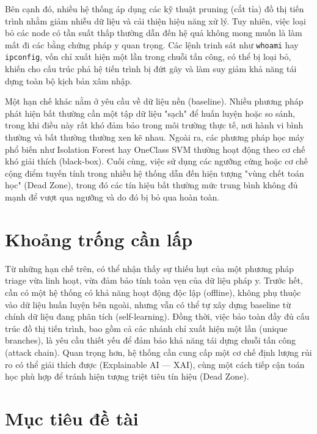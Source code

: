 \documentclass[../main.tex]{subfiles}
\begin{document}
Bên cạnh đó, nhiều hệ thống áp dụng các kỹ thuật pruning (cắt tỉa) đồ thị tiến trình nhằm giảm nhiễu dữ liệu và cải thiện hiệu năng xử lý. Tuy nhiên, việc loại bỏ các node có tần suất thấp thường dẫn đến hệ quả không mong muốn là làm mất đi các bằng chứng pháp y quan trọng. Các lệnh trinh sát như \texttt{whoami} hay \texttt{ipconfig}, vốn chỉ xuất hiện một lần trong chuỗi tấn công, có thể bị loại bỏ, khiến cho cấu trúc phả hệ tiến trình bị đứt gãy và làm suy giảm khả năng tái dựng toàn bộ kịch bản xâm nhập.

Một hạn chế khác nằm ở yêu cầu về dữ liệu nền (baseline). Nhiều phương pháp phát hiện bất thường cần một tập dữ liệu "sạch" để huấn luyện hoặc so sánh, trong khi điều này rất khó đảm bảo trong môi trường thực tế, nơi hành vi bình thường và bất thường thường xen kẽ nhau. Ngoài ra, các phương pháp học máy phổ biến như Isolation Forest hay OneClass SVM thường hoạt động theo cơ chế khó giải thích (black-box). Cuối cùng, việc sử dụng các ngưỡng cứng hoặc cơ chế cộng điểm tuyến tính trong nhiều hệ thống dẫn đến hiện tượng "vùng chết toán học" (Dead Zone), trong đó các tín hiệu bất thường mức trung bình không đủ mạnh để vượt qua ngưỡng và do đó bị bỏ qua hoàn toàn.

\section*{Khoảng trống cần lấp}

Từ những hạn chế trên, có thể nhận thấy sự thiếu hụt của một phương pháp triage vừa linh hoạt, vừa đảm bảo tính toàn vẹn của dữ liệu pháp y. Trước hết, cần có một hệ thống có khả năng hoạt động độc lập (offline), không phụ thuộc vào dữ liệu huấn luyện bên ngoài, nhưng vẫn có thể tự xây dựng baseline từ chính dữ liệu đang phân tích (self-learning). Đồng thời, việc bảo toàn đầy đủ cấu trúc đồ thị tiến trình, bao gồm cả các nhánh chỉ xuất hiện một lần (unique branches), là yêu cầu thiết yếu để đảm bảo khả năng tái dựng chuỗi tấn công (attack chain). Quan trọng hơn, hệ thống cần cung cấp một cơ chế định lượng rủi ro có thể giải thích được (Explainable AI — XAI), cùng một cách tiếp cận toán học phù hợp để tránh hiện tượng triệt tiêu tín hiệu (Dead Zone).

\section*{Mục tiêu đề tài}
\end{document}
